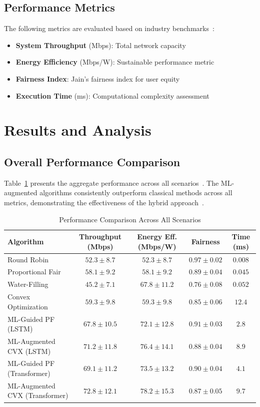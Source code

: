 \documentclass[conference]{IEEEtran}
\begin{document}
\subsection{Performance Metrics}

The following metrics are evaluated based on industry benchmarks~\cite{energy_efficient_6g}:
\begin{itemize}
    \item \textbf{System Throughput} (Mbps): Total network capacity
    \item \textbf{Energy Efficiency} (Mbps/W): Sustainable performance metric
    \item \textbf{Fairness Index}: Jain's fairness index for user equity
    \item \textbf{Execution Time} (ms): Computational complexity assessment
\end{itemize}

\section{Results and Analysis}

\subsection{Overall Performance Comparison}

Table~\ref{tab:results} presents the aggregate performance across all scenarios~\cite{qos_wireless}. The ML-augmented algorithms consistently outperform classical methods across all metrics, demonstrating the effectiveness of the hybrid approach~\cite{hybrid_systems}.

\begin{table}[t]
\centering
\caption{Performance Comparison Across All Scenarios}
\label{tab:results}
\begin{tabular}{@{}lcccc@{}}
\toprule
\textbf{Algorithm} & \textbf{Throughput (Mbps)} & \textbf{Energy Eff. (Mbps/W)} & \textbf{Fairness} & \textbf{Time (ms)} \\
\midrule
Round Robin & $52.3 \pm 8.7$ & $52.3 \pm 8.7$ & $0.97 \pm 0.02$ & $0.008$ \\
Proportional Fair & $58.1 \pm 9.2$ & $58.1 \pm 9.2$ & $0.89 \pm 0.04$ & $0.045$ \\
Water-Filling & $45.2 \pm 7.1$ & $67.8 \pm 11.2$ & $0.76 \pm 0.08$ & $0.052$ \\
Convex Optimization & $59.3 \pm 9.8$ & $59.3 \pm 9.8$ & $0.85 \pm 0.06$ & $12.4$ \\
\midrule
ML-Guided PF (LSTM) & $67.8 \pm 10.5$ & $72.1 \pm 12.8$ & $0.91 \pm 0.03$ & $2.8$ \\
ML-Augmented CVX (LSTM) & $71.2 \pm 11.8$ & $76.4 \pm 14.1$ & $0.88 \pm 0.04$ & $8.9$ \\
ML-Guided PF (Transformer) & $69.1 \pm 11.2$ & $73.5 \pm 13.2$ & $0.90 \pm 0.04$ & $4.1$ \\
ML-Augmented CVX (Transformer) & $72.8 \pm 12.1$ & $78.2 \pm 15.3$ & $0.87 \pm 0.05$ & $9.7$ \\
\bottomrule
\end{tabular}
\end{table}
\end{document}
